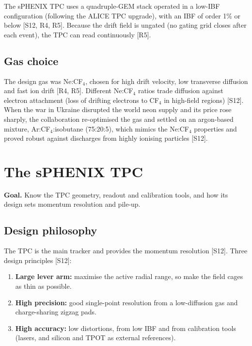 \documentclass[11pt,letterpaper]{article}
\newcommand{\goal}[1]{\par\noindent\textbf{Goal.} #1\par\smallskip}
\begin{document}
The sPHENIX TPC uses a quadruple-GEM stack operated in a low-IBF configuration (following the ALICE TPC upgrade), with an IBF of order 1\% or below [S12, R4, R5].
Because the drift field is ungated (no gating grid closes after each event), the TPC can read continuously [R5].

\subsection{Gas choice}
The design gas was Ne:CF$_4$, chosen for high drift velocity, low transverse diffusion and fast ion drift [R4, R5].
Different Ne:CF$_4$ ratios trade diffusion against electron attachment (loss of drifting electrons to CF$_4$ in high-field regions) [S12].
When the war in Ukraine disrupted the world neon supply and its price rose sharply, the collaboration re-optimised the gas and settled on an argon-based mixture, Ar:CF$_4$:isobutane (75:20:5), which mimics the Ne:CF$_4$ properties and proved robust against discharges from highly ionising particles [S12].

\section{The sPHENIX TPC}\label{sec:tpc}
\goal{Know the TPC geometry, readout and calibration tools, and how its design sets momentum resolution and pile-up.}

\subsection{Design philosophy}
The TPC is the main tracker and provides the momentum resolution [S12].
Three design principles [S12]:
\begin{enumerate}
\item \textbf{Large lever arm:} maximise the active radial range, so make the field cages as thin as possible.
\item \textbf{High precision:} good single-point resolution from a low-diffusion gas and charge-sharing zigzag pads.
\item \textbf{High accuracy:} low distortions, from low IBF and from calibration tools (lasers, and silicon and TPOT as external references).
\end{enumerate}
\end{document}
